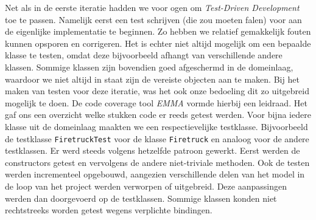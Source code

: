 \label{testen}
Net als in de eerste iteratie hadden we voor ogen om \textit{Test-Driven Development} toe te passen.
Namelijk eerst een test schrijven (die zou moeten falen) voor aan de eigenlijke implementatie te beginnen.
Zo hebben we relatief gemakkelijk fouten kunnen opsporen en corrigeren. Het is echter niet altijd mogelijk om een bepaalde klasse te testen, omdat deze bijvoorbeeld afhangt van verschillende andere klassen. Sommige klassen zijn bovendien goed afgeschermd in de domeinlaag, waardoor we niet altijd in staat zijn de vereiste objecten aan te maken.
Bij het maken van testen voor deze iteratie, was het ook onze bedoeling dit zo uitgebreid mogelijk te doen.
De code coverage tool \textit{EMMA} vormde hierbij een leidraad. Het gaf ons een overzicht welke stukken code er reeds getest werden.
Voor bijna iedere klasse uit de domeinlaag maakten we een respectievelijke testklasse.
Bijvoorbeeld de testklasse \texttt{FiretruckTest} voor de klasse \texttt{Firetruck} en analoog voor de andere testklassen.
Er werd steeds volgens hetzelfde patroon gewerkt. Eerst werden de constructors getest en vervolgens de andere niet-triviale methoden.
Ook de testen werden incrementeel opgebouwd, aangezien verschillende delen van het model in de loop van het project werden verworpen of uitgebreid.
Deze aanpassingen werden dan doorgevoerd op de testklassen. Sommige klassen konden niet rechtstreeks worden getest wegens verplichte bindingen.